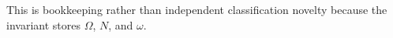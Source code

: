 This is bookkeeping rather than independent classification novelty because the invariant stores \(\Omega\), \(N\), and \(\omega\).